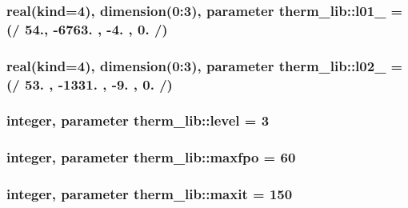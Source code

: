 \subsubsection[{\texorpdfstring{l01\+\_\+10}{l01_10}}]{\setlength{\rightskip}{0pt plus 5cm}real(kind=4), dimension(0\+:3), parameter therm\+\_\+lib\+::l01\+\_ = (/ 54., -\/6763. , -\/4. , 0. /)}\hypertarget{namespacetherm__lib_a32ef1fd4d35773be9ba1f5a7dbc13b6e}{}\label{namespacetherm__lib_a32ef1fd4d35773be9ba1f5a7dbc13b6e}
\subsubsection[{\texorpdfstring{l02\+\_\+10}{l02_10}}]{\setlength{\rightskip}{0pt plus 5cm}real(kind=4), dimension(0\+:3), parameter therm\+\_\+lib\+::l02\+\_ = (/ 53. , -\/1331. , -\/9. , 0. /)}\hypertarget{namespacetherm__lib_adaf6c70605ef5072ebc0a71bb1189d99}{}\label{namespacetherm__lib_adaf6c70605ef5072ebc0a71bb1189d99}
\subsubsection[{\texorpdfstring{level}{level}}]{\setlength{\rightskip}{0pt plus 5cm}integer, parameter therm\+\_\+lib\+::level = 3}\hypertarget{namespacetherm__lib_ace5c9fdd5940d4602568d9d3df5c930f}{}\label{namespacetherm__lib_ace5c9fdd5940d4602568d9d3df5c930f}
\subsubsection[{\texorpdfstring{maxfpo}{maxfpo}}]{\setlength{\rightskip}{0pt plus 5cm}integer, parameter therm\+\_\+lib\+::maxfpo = 60}\hypertarget{namespacetherm__lib_a726eec5f615e82a7ab9542aad323ff6b}{}\label{namespacetherm__lib_a726eec5f615e82a7ab9542aad323ff6b}
\subsubsection[{\texorpdfstring{maxit}{maxit}}]{\setlength{\rightskip}{0pt plus 5cm}integer, parameter therm\+\_\+lib\+::maxit = 150}\hypertarget{namespacetherm__lib_af55ed6ff22d96d8e9778f1b9711a5f29}{}\label{namespacetherm__lib_af55ed6ff22d96d8e9778f1b9711a5f29}
